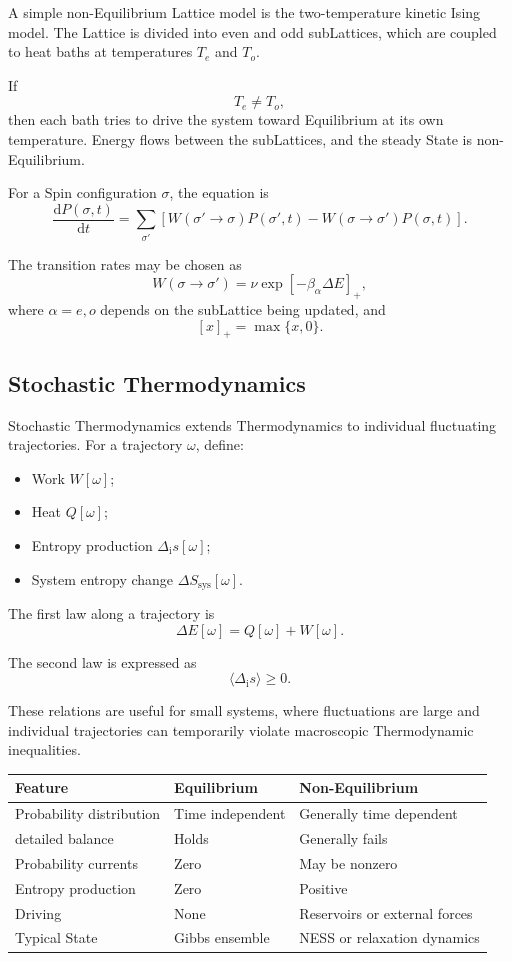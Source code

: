 \documentclass[a4paper, 10pt, onepage]{elegantbook}
\begin{document}
{A simple non-Equilibrium Lattice model is the two-temperature kinetic Ising
model. The Lattice is divided into even and odd subLattices, which are coupled
to heat baths at temperatures \(T_e\) and \(T_o\).

If
\[
T_e\ne T_o,
\]
then each bath tries to drive the system toward Equilibrium at its own
temperature. Energy flows between the subLattices, and the steady State is
non-Equilibrium.

For a Spin configuration \(\sigma\), the  equation is
\[
\frac{\mathrm dP(\sigma,t)}{\mathrm dt}
=
\sum_{\sigma'}
\left[
W(\sigma'\to\sigma)P(\sigma',t)
-
W(\sigma\to\sigma')P(\sigma,t)
\right].
\]

The transition rates may be chosen as
\[
W(\sigma\to\sigma')
=
\nu
\exp[-\beta_{\alpha}\Delta E]_{+},
\]
where \(\alpha=e,o\) depends on the subLattice being updated, and
\[
[x]_+=\max\{x,0\}.
\]

\subsection{Stochastic Thermodynamics}

Stochastic Thermodynamics extends Thermodynamics to individual fluctuating
trajectories. For a trajectory \(\omega\), define:

\begin{itemize}
\item Work \(W[\omega]\);
\item Heat \(Q[\omega]\);
\item Entropy production \(\Delta_{\mathrm i}s[\omega]\);
\item System entropy change \(\Delta S_{\mathrm{sys}}[\omega]\).
\end{itemize}

The first law along a trajectory is
\[
\Delta E[\omega]
=
Q[\omega]+W[\omega].
\]

The second law is expressed as
\[
\langle\Delta_{\mathrm i}s\rangle\ge0.
\]

These relations are useful for small systems, where fluctuations are large and
individual trajectories can temporarily violate macroscopic Thermodynamic
inequalities.

\begin{center}
\begin{tabular}{lll}
\hline
Feature & Equilibrium & Non-Equilibrium \\
\hline
Probability distribution & Time independent & Generally time dependent \\
detailed balance\index{detailed balance} & Holds & Generally fails \\
Probability currents & Zero & May be nonzero \\
Entropy production & Zero & Positive \\
Driving & None & Reservoirs or external forces \\
Typical State & Gibbs ensemble & NESS or relaxation dynamics \\
\hline
\end{tabular}
\end{center}

}
\end{document}
